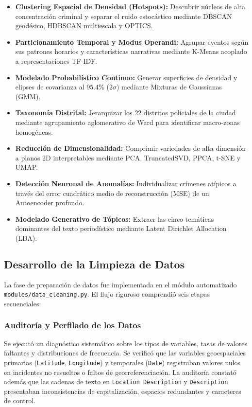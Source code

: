 \begin{itemize}
    \item \textbf{Clustering Espacial de Densidad (Hotspots):} Descubrir núcleos de alta concentración criminal y separar el ruido estocástico mediante DBSCAN geodésico, HDBSCAN multiescala y OPTICS.
    \item \textbf{Particionamiento Temporal y Modus Operandi:} Agrupar eventos según sus patrones horarios y características narrativas mediante K-Means acoplado a representaciones TF-IDF.
    \item \textbf{Modelado Probabilístico Continuo:} Generar superficies de densidad y elipses de covarianza al $95.4\%$ ($2\sigma$) mediante Mixturas de Gaussianas (GMM).
    \item \textbf{Taxonomía Distrital:} Jerarquizar los 22 distritos policiales de la ciudad mediante agrupamiento aglomerativo de Ward para identificar macro-zonas homogéneas.
    \item \textbf{Reducción de Dimensionalidad:} Comprimir variedades de alta dimensión a planos 2D interpretables mediante PCA, TruncatedSVD, PPCA, t-SNE y UMAP.
    \item \textbf{Detección Neuronal de Anomalías:} Individualizar crímenes atípicos a través del error cuadrático medio de reconstrucción (MSE) de un Autoencoder profundo.
    \item \textbf{Modelado Generativo de Tópicos:} Extraer las cinco temáticas dominantes del texto periodístico mediante Latent Dirichlet Allocation (LDA).
\end{itemize}

\subsection{Desarrollo de la Limpieza de Datos}

La fase de preparación de datos fue implementada en el módulo automatizado \texttt{modules/\allowbreak data\_cleaning.py}. El flujo riguroso comprendió seis etapas secuenciales:

\subsubsection{Auditoría y Perfilado de los Datos}

Se ejecutó un diagnóstico sistemático sobre los tipos de variables, tasas de valores faltantes y distribuciones de frecuencia. Se verificó que las variables geoespaciales primarias (\texttt{Latitude}, \texttt{Longitude}) y temporales (\texttt{Date}) registraban valores nulos en incidentes no resueltos o faltos de georreferenciación. La auditoría constató además que las cadenas de texto en \texttt{Location Description} y \texttt{Description} presentaban inconsistencias de capitalización, espacios redundantes y caracteres de control.

